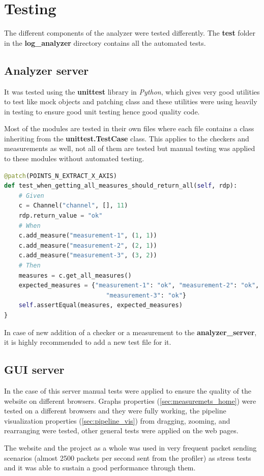 \section{Testing}
The different components of the analyzer were tested differently. The \textbf{test} folder in the
\textbf{log\_analyzer} directory contains all the automated tests.

\subsection{Analyzer server}
It was tested using the \textbf{unittest} library  in \textit{Python}, which gives very good
utilities to test like mock objects and patching class and these utilities were using heavily
in testing to ensure good unit testing hence good quality code.

Most of the modules are tested in their own files where each file contains a class inheriting
from the \textbf{unittest.TestCase} class. This applies to the checkers and measurements as well,
not all of them are tested but manual testing was applied to these modules without automated testing.
\newline
\begin{lstlisting}[language=python, caption={Example of the automated tests},captionpos=b]
@patch(POINTS_N_EXTRACT_X_AXIS)
def test_when_getting_all_measures_should_return_all(self, rdp):
	# Given
	c = Channel("channel", [], 11)
	rdp.return_value = "ok"
	# When
	c.add_measure("measurement-1", (1, 1))
	c.add_measure("measurement-2", (2, 1))
	c.add_measure("measurement-3", (3, 2))
	# Then
	measures = c.get_all_measures()
	expected_measures = {"measurement-1": "ok", "measurement-2": "ok",
							"measurement-3": "ok"}
	self.assertEqual(measures, expected_measures)
}
\end{lstlisting}

In case of new addition of a checker or a measurement to the \textbf{analyzer\_server}, it is
highly recommended to add a new test file for it.

\subsection{GUI server}
In the case of this server manual tests were applied to ensure the quality of the website on 
different browsers. Graphs properties (\ref{sec:measuremets_home}) were tested on a different browsers
and they were fully working, the pipeline visualization properties (\ref{sec:pipeline_vis}) from dragging, 
zooming, and rearranging were tested, other general tests were applied on the web pages.

The website and the project as a whole was used in very frequent packet sending scenarios (almost 2500
packets per second sent from the profiler) as
stress tests and it was able to sustain a good performance through them.